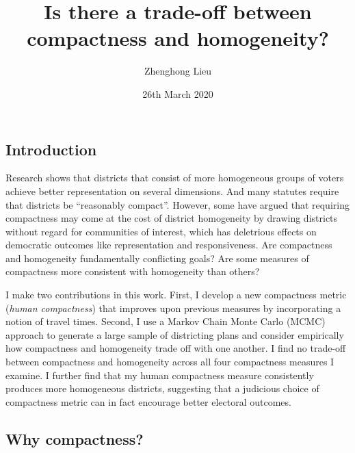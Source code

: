 \documentclass[]{article}
\title{Is there a trade-off between compactness and homogeneity?}
\author{Zhenghong Lieu}
\date{26th March 2020}
\begin{document}
\maketitle

\def\citeapos#1{\citeauthor{#1}'s (\citeyear{#1})}

\hypertarget{introduction}{%
\subsection{Introduction}\label{introduction}}

Research shows that districts that consist of more homogeneous groups of
voters achieve better representation on several dimensions. And many
statutes require that districts be ``reasonably compact''. However, some
have argued that requiring compactness may come at the cost of district
homogeneity by drawing districts without regard for communities of
interest, which has deletrious effects on democratic outcomes like
representation and responsiveness. Are compactness and homogeneity
fundamentally conflicting goals? Are some measures of compactness more
consistent with homogeneity than others?

I make two contributions in this work. First, I develop a new
compactness metric (\emph{human compactness}) that improves upon
previous measures by incorporating a notion of travel times. Second, I
use a Markov Chain Monte Carlo (MCMC) approach to generate a large
sample of districting plans and consider empirically how compactness and
homogeneity trade off with one another. I find no trade-off between
compactness and homogeneity across all four compactness measures I
examine. I further find that my human compactness measure consistently
produces more homogeneous districts, suggesting that a judicious choice
of compactness metric can in fact encourage better electoral outcomes.

\hypertarget{why-compactness}{%
\subsection{Why compactness?}\label{why-compactness}}
\end{document}
